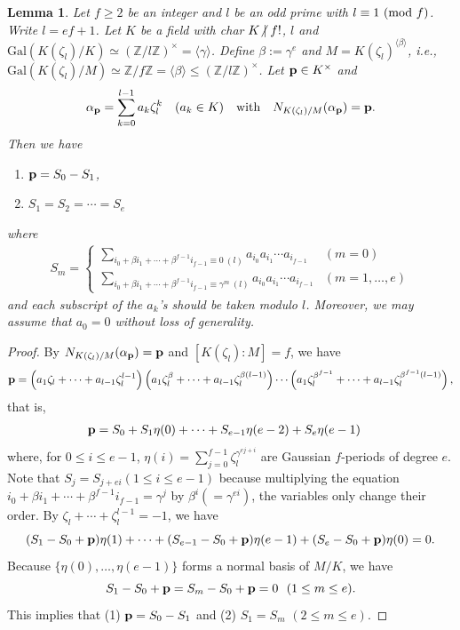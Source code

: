 \documentclass[a4paper, 11pt]{amsart}
\newcommand{\notmid}{\mathrel{\ooalign{$\mkern-5mu\not$\crcr$|$}}}
\newcommand{\Z}{\mathbb Z}
\newcommand{\Gal}{\mathrm{Gal}}
\theoremstyle{plain}
\newtheorem{lem}[thm]{Lemma}
\theoremstyle{definition}
\numberwithin{equation}{section}
\begin{document}
\begin{lem} \label{lem:BEW2}
Let $f\geq2$ be an integer and $l$ be an odd prime with $l \equiv 1\ ({\rm mod}\ f)$. 
Write $l=ef+1$.
Let $K$ be a field with char $K\notmid f!$, $l$ and 
$\Gal(K(\zeta_l)/K)\simeq (\Z/l\Z)^{\times}=\langle \gamma \rangle$. 
Define $\beta := \gamma^e$ and $M=K(\zeta_l)^{\langle \beta \rangle}$, 
i.e., $\Gal(K(\zeta_l)/M)\simeq \Z/f\Z = \langle \beta \rangle \leq  (\Z/l\Z)^{\times}$.
Let ${\bf p}\in K^{\times}$ and
\[
\alpha_{\bf p}=\sum_{k=0}^{l-1}a_k\zeta_l^k \quad (a_k \in K)\\
\quad \text{with} \quad
N_{K(\zeta_l)/M}(\alpha_{\bf p})= {\bf p}.
\]
Then we have
\begin{enumerate}
\item [$(1)$] ${\bf p} =S_0 - S_1$,
\item [$(2)$] $S_1=S_2=\cdots =S_{e}$
\end{enumerate}
where 
\begin{align*}
S_m = 
\left\{
\begin{array}{ll}
\displaystyle
\sum_{i_0 + \beta i_1 + \cdots +\beta^{f-1}i_{f-1}\equiv 0 \ (l)}a_{i_0}a_{i_1}\cdots a_{i_{f-1}} & (m = 0)\\
\displaystyle
\sum_{i_0 + \beta i_1 + \cdots +\beta^{f-1}i_{f-1}\equiv \gamma^{m} \ (l)}a_{i_0}a_{i_1}\cdots a_{i_{f-1}} & (m = 1,\ldots,e)
\end{array}
\right.
\end{align*}
and each subscript of the $a_k$'s should be taken modulo $l$. 
Moreover, we may assume that $a_0=0$ without loss of generality.
\end{lem}
\begin{proof}
By $N_{K(\zeta_l)/M}(\alpha_{\bf p})= {\bf p}$ and $[K(\zeta_l):M]=f$, we have 
\begin{align*}
{\bf p} = \Big( a_1\zeta_l +  \cdots +a_{l-1}\zeta_l^{l-1}\Big) \left( a_1\zeta_l^{\beta} +  \cdots +a_{l-1}\zeta_l^{\beta(l-1)}\right) \cdots \left( a_1\zeta_l^{\beta^{f-1}} +  \cdots +a_{l-1}\zeta_l^{\beta^{f-1}(l-1)}\right) ,
\end{align*}
that is,
\begin{align*}
{\bf p} 
&= S_0 + S_1\eta(0) + \cdots + S_{e-1}\eta(e-2) + S_e \eta(e-1)
\end{align*}
where, for $0\leq i \leq e-1$, $\eta(i)=\sum_{j=0}^{f-1}\zeta_l^{\gamma ^{ej+i}}$ are Gaussian $f$-periods of degree $e$.
Note that  $S_j =S_{j+ei} (1\leq i \leq e-1)$ 
because multiplying the equation $i_0 + \beta i_1 + \cdots +\beta^{f-1}i_{f-1}=\gamma^j$ by $\beta^i(=\gamma^{ei})$, 
the variables only change their order.
By $\zeta_l+\cdots+\zeta_l^{l-1}=-1$, we have
\[
(S_1 - S_0 + {\bf p})\eta(1)  + 
 \cdots + (S_{e-1} - S_0 + {\bf p})\eta(e-1) + (S_e - S_0 + {\bf p})\eta(0) = 0.
\]
Because $\{\eta(0), \ldots, \eta(e-1)\}$ forms a normal basis of $M/K$, 
we have
\[
S_1 - S_0 + {\bf p} = S_m - S_0 + {\bf p}=0\ \ (1\leq m\leq e).
\]
This implies that 
(1) ${\bf p}= S_0 - S_1$ and (2) $S_1=S_m$ 
$(2\leq m\leq e)$. 
\end{proof}
\end{document}

